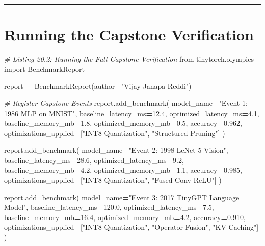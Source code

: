\documentclass[
  letterpaper,
]{scrbook}
\newenvironment{Shaded}{\begin{snugshade}}{\end{snugshade}}
\newcommand{\CommentTok}[1]{\textcolor[rgb]{0.56,0.35,0.01}{\textit{#1}}}
\newcommand{\FloatTok}[1]{\textcolor[rgb]{0.00,0.00,0.81}{#1}}
\newcommand{\ImportTok}[1]{#1}
\newcommand{\NormalTok}[1]{#1}
\newcommand{\OperatorTok}[1]{\textcolor[rgb]{0.81,0.36,0.00}{\textbf{#1}}}
\newcommand{\StringTok}[1]{\textcolor[rgb]{0.31,0.60,0.02}{#1}}
\begin{document}
\begin{center}\rule{0.5\linewidth}{0.5pt}\end{center}

\section{Running the Capstone
Verification}\label{running-the-capstone-verification}

\begin{Shaded}
\begin{Highlighting}[]
\CommentTok{\# Listing 20.2: Running the Full Capstone Verification}
\ImportTok{from}\NormalTok{ tinytorch.olympics }\ImportTok{import}\NormalTok{ BenchmarkReport}

\NormalTok{report }\OperatorTok{=}\NormalTok{ BenchmarkReport(author}\OperatorTok{=}\StringTok{"Vijay Janapa Reddi"}\NormalTok{)}

\CommentTok{\# Register Capstone Events}
\NormalTok{report.add\_benchmark(}
\NormalTok{    model\_name}\OperatorTok{=}\StringTok{"Event 1: 1986 MLP on MNIST"}\NormalTok{,}
\NormalTok{    baseline\_latency\_ms}\OperatorTok{=}\FloatTok{12.4}\NormalTok{,}
\NormalTok{    optimized\_latency\_ms}\OperatorTok{=}\FloatTok{4.1}\NormalTok{,}
\NormalTok{    baseline\_memory\_mb}\OperatorTok{=}\FloatTok{1.8}\NormalTok{,}
\NormalTok{    optimized\_memory\_mb}\OperatorTok{=}\FloatTok{0.5}\NormalTok{,}
\NormalTok{    accuracy}\OperatorTok{=}\FloatTok{0.962}\NormalTok{,}
\NormalTok{    optimizations\_applied}\OperatorTok{=}\NormalTok{[}\StringTok{"INT8 Quantization"}\NormalTok{, }\StringTok{"Structured Pruning"}\NormalTok{]}
\NormalTok{)}

\NormalTok{report.add\_benchmark(}
\NormalTok{    model\_name}\OperatorTok{=}\StringTok{"Event 2: 1998 LeNet{-}5 Vision"}\NormalTok{,}
\NormalTok{    baseline\_latency\_ms}\OperatorTok{=}\FloatTok{28.6}\NormalTok{,}
\NormalTok{    optimized\_latency\_ms}\OperatorTok{=}\FloatTok{9.2}\NormalTok{,}
\NormalTok{    baseline\_memory\_mb}\OperatorTok{=}\FloatTok{4.2}\NormalTok{,}
\NormalTok{    optimized\_memory\_mb}\OperatorTok{=}\FloatTok{1.1}\NormalTok{,}
\NormalTok{    accuracy}\OperatorTok{=}\FloatTok{0.985}\NormalTok{,}
\NormalTok{    optimizations\_applied}\OperatorTok{=}\NormalTok{[}\StringTok{"INT8 Quantization"}\NormalTok{, }\StringTok{"Fused Conv{-}ReLU"}\NormalTok{]}
\NormalTok{)}

\NormalTok{report.add\_benchmark(}
\NormalTok{    model\_name}\OperatorTok{=}\StringTok{"Event 3: 2017 TinyGPT Language Model"}\NormalTok{,}
\NormalTok{    baseline\_latency\_ms}\OperatorTok{=}\FloatTok{120.0}\NormalTok{,}
\NormalTok{    optimized\_latency\_ms}\OperatorTok{=}\FloatTok{7.5}\NormalTok{,}
\NormalTok{    baseline\_memory\_mb}\OperatorTok{=}\FloatTok{16.4}\NormalTok{,}
\NormalTok{    optimized\_memory\_mb}\OperatorTok{=}\FloatTok{4.2}\NormalTok{,}
\NormalTok{    accuracy}\OperatorTok{=}\FloatTok{0.910}\NormalTok{,}
\NormalTok{    optimizations\_applied}\OperatorTok{=}\NormalTok{[}\StringTok{"INT8 Quantization"}\NormalTok{, }\StringTok{"Operator Fusion"}\NormalTok{, }\StringTok{"KV Caching"}\NormalTok{]}
\NormalTok{)}


\end{Highlighting}
\end{Shaded}
\end{document}
